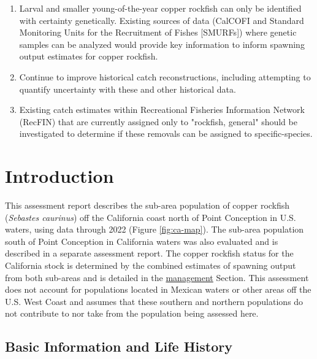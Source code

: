 \documentclass[11pt,
  english,
  letterpaper,
]{article}
\begin{document}
\begin{enumerate}
 \item Larval and smaller young-of-the-year copper rockfish can only be identified with certainty genetically. Existing sources of data (CalCOFI and Standard Monitoring Units for the Recruitment of Fishes [SMURFs]) where genetic samples can be analyzed would provide key information to inform spawning output estimates for copper rockfish.
 
  \item Continue to improve historical catch reconstructions, including attempting to quantify uncertainty with these and other historical data.
  
  \item Existing catch estimates within Recreational Fisheries Information Network (RecFIN) that are currently assigned only to "rockfish, general" should be investigated to determine if these removals can be assigned to specific-species.



\end{enumerate}

\pagebreak
\setlength{\parskip}{5mm plus1mm minus1mm}
\setcounter{page}{1}
\renewcommand{\thefigure}{\arabic{figure}}
\renewcommand{\thetable}{\arabic{table}}
\setcounter{table}{0}
\setcounter{figure}{0}

\hypertarget{introduction}{%
\section{Introduction}\label{introduction}}

This assessment report describes the sub-area population of copper rockfish (\emph{Sebastes caurinus}) off the California coast north of Point Conception in U.S. waters, using data through 2022 (Figure \ref{fig:ca-map}). The sub-area population south of Point Conception in California waters was also evaluated and is described in a separate assessment report. The copper rockfish status for the California stock is determined by the combined estimates of spawning output from both sub-areas and is detailed in the \protect\hyperlink{management}{management} Section. This assessment does not account for populations located in Mexican waters or other areas off the U.S. West Coast and assumes that these southern and northern populations do not contribute to nor take from the population being assessed here.

\hypertarget{basic-information-and-life-history}{%
\subsection{Basic Information and Life History}\label{basic-information-and-life-history}}
\end{document}
